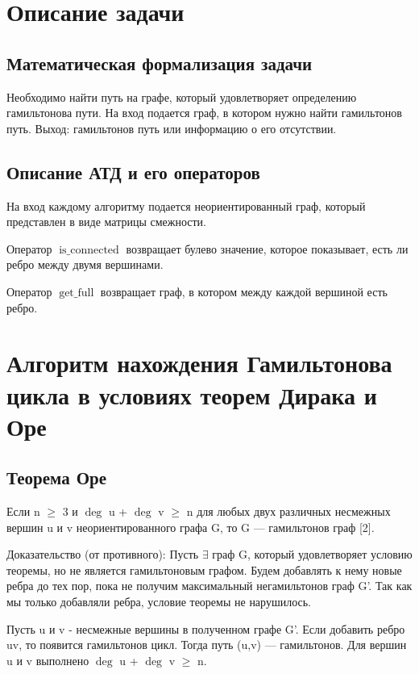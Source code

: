 \newpage

\section{Описание задачи}

\subsection{Математическая формализация задачи}
Необходимо найти путь на графе, который удовлетворяет определению гамильтонова пути.
На вход подается граф, в котором нужно найти гамильтонов путь.
Выход: гамильтонов путь или информацию о его отсутствии.

\subsection{Описание АТД и его операторов}
На вход каждому алгоритму подается неориентированный граф, который представлен в виде матрицы смежности.

Оператор $\operatorname{is\_connected}$ возвращает булево значение, которое показывает, есть ли ребро между двумя вершинами.

Оператор $\operatorname{get\_full}$ возвращает граф, в котором между каждой вершиной есть ребро.



\newpage

\section{Алгоритм нахождения Гамильтонова цикла в условиях теорем Дирака и Оре}

\subsection{Теорема Оре}
Если n $\geq$ 3 и $\operatorname{deg}$ u + $\operatorname{deg}$ v $\geq$ n для любых двух различных несмежных вершин u и v неориентированного графа  G, то  G — гамильтонов граф [2].

{Доказательство (от противного):}
Пусть $\exists$ граф G, который удовлетворяет условию теоремы, но не является гамильтоновым графом.
Будем добавлять к нему новые ребра до тех пор, пока не получим максимальный негамильтонов граф G'.
Так как мы только добавляли ребра, условие теоремы не нарушилось.

Пусть u и v - несмежные вершины в полученном графе G'.
Если добавить ребро uv, то появится гамильтонов цикл. Тогда путь (u,v) — гамильтонов.
Для вершин u и v выполнено $\operatorname{deg}$ u + $\operatorname{deg}$ v $\geqslant$ n.


